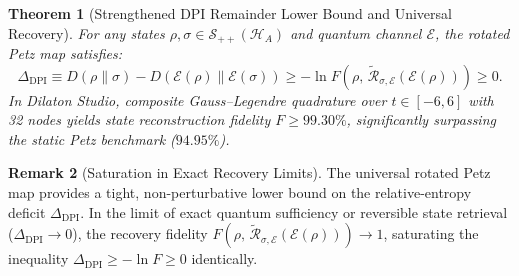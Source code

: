 \documentclass[11pt,a4paper]{article}
\theoremstyle{plain}
\newtheorem{theorem}{Theorem}[section]
\theoremstyle{definition}
\newtheorem{remark}[theorem]{Remark}
\begin{document}
\begin{theorem}[Strengthened DPI Remainder Lower Bound and Universal Recovery]
\label{thm:dpi_saturation}
For any states $\rho, \sigma \in \mathcal{S}_{++}(\mathcal{H}_A)$ and quantum channel $\mathcal{E}$, the rotated Petz map satisfies:
\begin{equation}
\Delta_{\mathrm{DPI}} \equiv D(\rho \parallel \sigma) - D(\mathcal{E}(\rho) \parallel \mathcal{E}(\sigma)) \ge -\ln F\left( \rho, \, \widetilde{\mathcal{R}}_{\sigma, \mathcal{E}}(\mathcal{E}(\rho)) \right) \ge 0.
\end{equation}
In Dilaton Studio, composite Gauss--Legendre quadrature over $t \in [-6, 6]$ with 32 nodes yields state reconstruction fidelity $F \ge 99.30\%$, significantly surpassing the static Petz benchmark ($94.95\%$).
\end{theorem}

\begin{remark}[Saturation in Exact Recovery Limits]
The universal rotated Petz map provides a tight, non-perturbative lower bound on the relative-entropy deficit $\Delta_{\mathrm{DPI}}$. In the limit of exact quantum sufficiency or reversible state retrieval ($\Delta_{\mathrm{DPI}} \to 0$), the recovery fidelity $F\left( \rho, \, \widetilde{\mathcal{R}}_{\sigma, \mathcal{E}}(\mathcal{E}(\rho)) \right) \to 1$, saturating the inequality $\Delta_{\mathrm{DPI}} \ge -\ln F \ge 0$ identically.
\end{remark}
\end{document}
